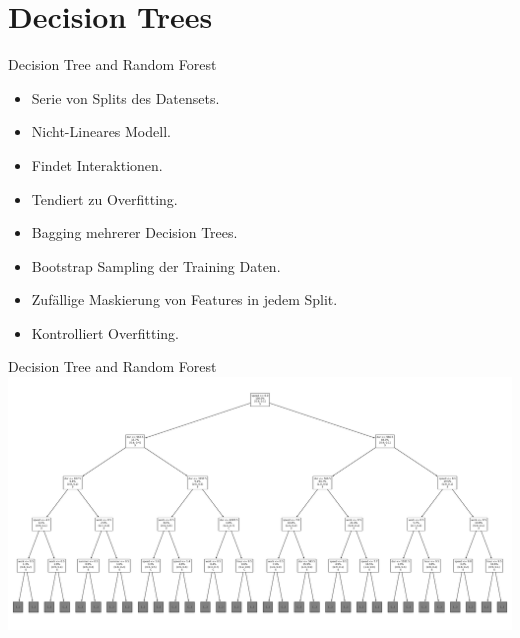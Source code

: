 \section{Decision Trees}

\begin{frame}{Decision Tree and Random Forest}
{
\begin{itemize}
\item Serie von Splits des Datensets.
\item Nicht-Lineares Modell.
\item Findet Interaktionen.
\item Tendiert zu Overfitting.
\end{itemize}
}
{
\begin{itemize}
\item Bagging mehrerer Decision Trees.
\item Bootstrap Sampling der Training Daten.
\item Zufällige Maskierung von Features in jedem Split.
\item Kontrolliert Overfitting.
\end{itemize}
}
\end{frame}

\begin{frame}{Decision Tree and Random Forest}
\includegraphics[width=\textwidth]{../Images/ExampleTree}
\end{frame}

